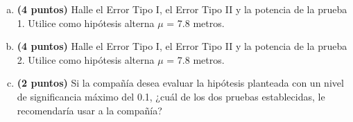 \documentclass[../main.tex]{subfiles}
\begin{document}
\begin{enumerate}[(a)]

\item \textbf{(4 puntos)} Halle el Error Tipo I, el Error Tipo II y la potencia de la prueba 1. Utilice como hipótesis alterna $\mu$ = 7.8 metros.

\item \textbf{(4 puntos)} Halle el Error Tipo I, el Error Tipo II y la potencia de la prueba 2. Utilice como hipótesis alterna $\mu$ = 7.8 metros.

\item \textbf{(2 puntos)} Si la compañía desea evaluar la hipótesis planteada con un nivel de significancia máximo del 0.1, ¿cuál de los dos pruebas establecidas, le recomendaría usar a la compañía?

\end{enumerate}
\end{document}
